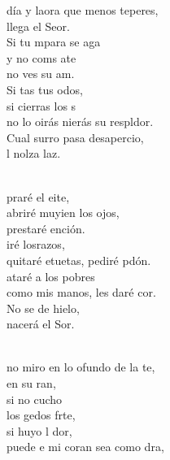 \documentclass[12pt]{article}
\begin{document}
\begin{multicols*}{2}
\begin{cancion}%
	día y laora que menos teperes,\\
	llega el Seor. \\
	Si tu mpara se aga  \\
	y no coms ate\\
	no ves su am. \\
	Si tas tus odos, \\
	si cierras los s\\
	no lo oirás nierás su respldor.\\
	Cual surro pasa desapercio,\\
	l nolza laz.\\\jump\\
	\begin{chorus}%
	praré el eite, \\
	abriré muyien los ojos, \\
	prestaré ención.\\
	iré losrazos, \\
	quitaré etuetas, pediré pdón.\\
	ataré a los pobres \\
	como mis manos, les daré cor.\\
	No se de hielo,  \\
	nacerá el Sor.\\
	\end{chorus}%
	\jump\\
	no miro en lo ofundo de la te, \\
	en su ran, \\
	si no cucho \\
	los gedos  frte,\\
	si huyo l dor,\\
	puede e mi coran sea como dra, \\

\end{cancion}
\end{multicols*}
\end{document}
